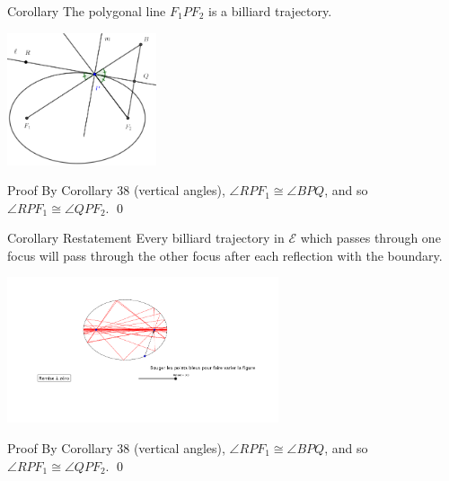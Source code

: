 \documentclass[compress,aspectratio=169,10pt,usenames,dvipsnames]{beamer}
\begin{document}
\begin{frame}

\vfill
\begin{block}{Corollary}
The polygonal line $F_1PF_2$ is a billiard trajectory. 
\end{block}

\begin{center}
\includegraphics[width=0.33\textwidth]{EllipseProp1E}
\end{center}

\begin{block}{Proof}
By Corollary 38 (vertical angles), $\angle RPF_1 \cong \angle BPQ$, and so $\angle RPF_1 \cong \angle QPF_2$. \qed
\end{block}

\vfill

\end{frame}


\begin{frame}

\vfill
\begin{block}{Corollary Restatement}
Every billiard trajectory in $\mathcal{E}$ which passes through one focus will pass through the other focus after each reflection with the boundary. 
\end{block}

\begin{center}
\includegraphics[width=0.6\textwidth]{EllBillFoc}
\end{center}

\begin{block}{Proof}
By Corollary 38 (vertical angles), $\angle RPF_1 \cong \angle BPQ$, and so $\angle RPF_1 \cong \angle QPF_2$. \qed
\end{block}

\vfill

\end{frame}
\end{document}
